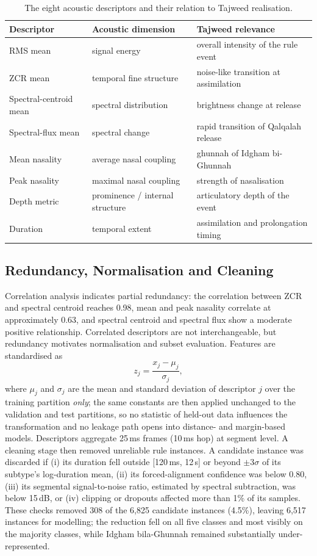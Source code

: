 \documentclass[runningheads]{llncs}
\begin{document}
\begin{table}[t]
\centering
\caption{The eight acoustic descriptors and their relation to Tajweed
realisation.}
\label{tab:features}
\begin{tabular}{lll}
\hline
Descriptor & Acoustic dimension & Tajweed relevance \\
\hline
RMS mean & signal energy & overall intensity of the rule event \\
ZCR mean & temporal fine structure & noise-like transition at assimilation \\
Spectral-centroid mean & spectral distribution & brightness change at release \\
Spectral-flux mean & spectral change & rapid transition of Qalqalah release \\
Mean nasality & average nasal coupling & ghunnah of Idgham bi-Ghunnah \\
Peak nasality & maximal nasal coupling & strength of nasalisation \\
Depth metric & prominence / internal structure & articulatory depth of the event \\
Duration & temporal extent & assimilation and prolongation timing \\
\hline
\end{tabular}
\end{table}

\subsection{Redundancy, Normalisation and Cleaning}

Correlation analysis indicates partial redundancy: the correlation between ZCR
and spectral centroid reaches 0.98, mean and peak nasality correlate at
approximately 0.63, and spectral centroid and spectral flux show a moderate
positive relationship. Correlated descriptors are not interchangeable, but
redundancy motivates normalisation and subset evaluation. Features are
standardised as
\begin{equation}
z_j = \frac{x_j - \mu_j}{\sigma_j},
\label{eq:standardise}
\end{equation}
where $\mu_j$ and $\sigma_j$ are the mean and standard deviation of
descriptor $j$ over the training partition \emph{only}; the same constants are
then applied unchanged to the validation and test partitions, so no statistic
of held-out data influences the transformation and no leakage path opens into
distance- and margin-based models. Descriptors aggregate 25\,ms frames
(10\,ms hop) at segment level. A cleaning stage then removed unreliable rule instances. A candidate instance
was discarded if (i) its duration fell outside [120\,ms, 12\,s] or beyond
$\pm3\sigma$ of its subtype's log-duration mean, (ii) its forced-alignment
confidence was below 0.80, (iii) its segmental signal-to-noise ratio, estimated
by spectral subtraction, was below 15\,dB, or (iv) clipping or dropouts affected
more than 1\% of its samples. These checks removed 308 of the 6{,}825 candidate
instances (4.5\%), leaving 6{,}517 instances for modelling; the reduction fell
on all five classes and most visibly on the majority classes, while Idgham
bila-Ghunnah remained substantially under-represented.
\end{document}
